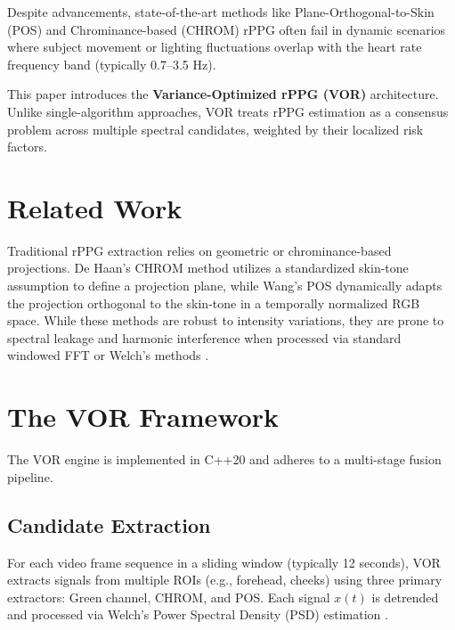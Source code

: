 \documentclass[10pt,journal,compsoc]{IEEEtran}
\begin{document}
Despite advancements, state-of-the-art methods like Plane-Orthogonal-to-Skin (POS) \cite{wang2016algorithmic} and Chrominance-based (CHROM) \cite{dehaan2013robust} rPPG often fail in dynamic scenarios where subject movement or lighting fluctuations overlap with the heart rate frequency band (typically 0.7--3.5 Hz).

This paper introduces the \textbf{Variance-Optimized rPPG (VOR)} architecture. Unlike single-algorithm approaches, VOR treats rPPG estimation as a consensus problem across multiple spectral candidates, weighted by their localized risk factors.

\section{Related Work}
Traditional rPPG extraction relies on geometric or chrominance-based projections. De Haan's CHROM method \cite{dehaan2013robust} utilizes a standardized skin-tone assumption to define a projection plane, while Wang's POS \cite{wang2016algorithmic} dynamically adapts the projection orthogonal to the skin-tone in a temporally normalized RGB space. While these methods are robust to intensity variations, they are prone to spectral leakage and harmonic interference when processed via standard windowed FFT or Welch's methods \cite{welch1967use}.

\section{The VOR Framework}
The VOR engine is implemented in C++20 and adheres to a multi-stage fusion pipeline.

\subsection{Candidate Extraction}
For each video frame sequence in a sliding window (typically 12 seconds), VOR extracts signals from multiple ROIs (e.g., forehead, cheeks) using three primary extractors: Green channel, CHROM, and POS. Each signal $x(t)$ is detrended and processed via Welch's Power Spectral Density (PSD) estimation \cite{welch1967use}.
\end{document}
